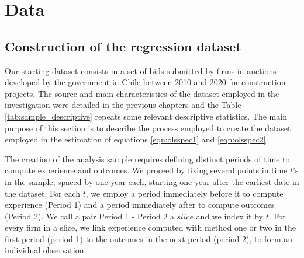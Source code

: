 \section{Data}
\subsection{Construction of the regression dataset}

\label{section:main_data}
Our starting dataset consists in a set of bids submitted by firms in auctions developed by the government in Chile between 2010 and 2020 for construction projects. The source and main characteristics of the dataset employed in the investigation were detailed in the previous chapters and the Table \ref{tab:sample_descriptive} repeats some relevant descriptive statistics. The main purpose of this section is to describe the process employed to create the dataset employed in the estimation of equations \ref{eqn:olsspec1} and \ref{eqn:olsspec2}.



The creation of the analysis sample requires defining distinct periods of time to compute experience and outcomes. We proceed by fixing several points in time $t$'s in the sample, spaced by one year each, starting one year after the earliest date in the dataset. For each $t$, we employ a period immediately before it to compute experience (Period 1) and a period immediately after to compute outcomes (Period 2). We call a pair Period 1 - Period 2 a $slice$ and we index it by $t$. For every firm in a slice, we link experience computed with method one or two  in the first period (period 1) to the outcomes in the next period (period 2), to form an individual observation.

